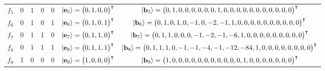 \documentclass{ws-procs9x6}
\begin{document}
\begin{sidewaystable}
{\begin{tabular}{ccccccc}
$f_5   $&0  &  1 &   0 &   0  & $\vert {\bf e}_5    \rangle=\begin{pmatrix} 0  ,  1 ,   0 ,   0  \end{pmatrix}^\intercal$&{\scriptsize$\vert {\bf b}_5    \rangle=\begin{pmatrix}0 , 1 , 0 , 0 , 0 , 0 , 0 , 0 , 1 , 0 , 0 , 0 , 0 , 0 , 0 , 0 , 0 , 0 , 0 , 0 \end{pmatrix}^\intercal                                           $}\\
$f_6   $&0  &  1 &   0 &   1  & $\vert {\bf e}_6    \rangle=\begin{pmatrix} 0  ,  1 ,   0 ,   1  \end{pmatrix}^\intercal$&{\scriptsize$\vert {\bf b}_6    \rangle=\begin{pmatrix}0 , 1 , 0 , 1 , 0 , -1 , 0 , -2 , -1 , 1 , 0 , 0 , 0 , 0 , 0 , 0 , 0 , 0 , 0 , 0 \end{pmatrix}^\intercal                                        $}\\
$f_7   $&0  &  1 &   1 &   0  & $\vert {\bf e}_7    \rangle=\begin{pmatrix} 0  ,  1 ,   1 ,   0  \end{pmatrix}^\intercal$&{\scriptsize$\vert {\bf b}_7    \rangle=\begin{pmatrix}0 , 1 , 1 , 0 , 0 , 0 , -1 , -2 , -1 , -6 , 1 , 0 , 0 , 0 , 0 , 0 , 0 , 0 , 0 , 0 \end{pmatrix}^\intercal                                       $}\\
$f_8   $&0  &  1 &   1 &   1  & $\vert {\bf e}_8    \rangle=\begin{pmatrix} 0  ,  1 ,   1 ,   1  \end{pmatrix}^\intercal$&{\scriptsize$\vert {\bf b}_8    \rangle=\begin{pmatrix}0 , 1 , 1 , 1 , 0 , -1 , -1 , -4 , -1 , -12 , -84 , 1 , 0 , 0 , 0 , 0 , 0 , 0 , 0 , 0 \end{pmatrix}^\intercal                                   $}\\
$f_9   $&1  &  0 &   0 &   0  & $\vert {\bf e}_9    \rangle=\begin{pmatrix} 1  ,  0 ,   0 ,   0  \end{pmatrix}^\intercal$&{\scriptsize$\vert {\bf b}_9    \rangle=\begin{pmatrix}1 , 0 , 0 , 0 , 0 , 0 , 0 , 0 , 0 , 0 , 0 , 0 , 1 , 0 , 0 , 0 , 0 , 0 , 0 , 0 \end{pmatrix}^\intercal                                           $}\\

\end{tabular}}
\end{sidewaystable}
\end{document}
